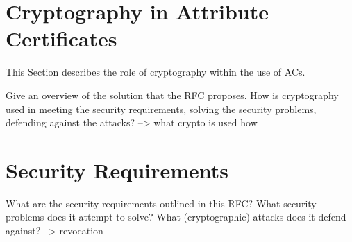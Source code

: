 \documentclass[10pt,conference,a4paper]{IEEEtran}
\begin{document}
\section{Cryptography in Attribute Certificates}
\label{cryptography_in_ac}
This Section describes the role of cryptography within the use of ACs.


Give an overview of the solution that the RFC proposes. How is cryptography used in meeting the security requirements, solving the security problems, defending against the attacks?
--> what crypto is used how

\section{Security Requirements}
\label{security_requirements}
What are the security requirements outlined in this RFC? What security problems does it attempt to solve? What (cryptographic) attacks does it defend against?
--> revocation



\end{document}
